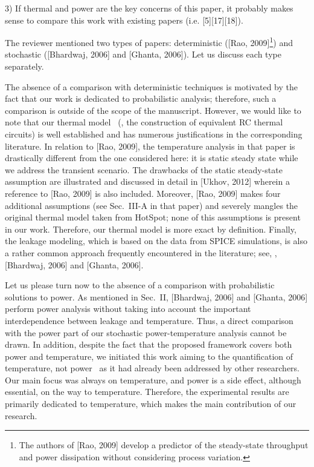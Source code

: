 \begin{reviewer}
3) If thermal and power are the key concerns of this paper, it probably makes sense to compare this work with existing papers (i.e. [5][17][18]).
\end{reviewer}
\begin{authors}
The reviewer mentioned two types of papers: deterministic ([Rao, 2009]\footnote{The authors of [Rao, 2009] develop a predictor of the steady-state throughput and power dissipation without considering process variation.}) and stochastic ([Bhardwaj, 2006] and [Ghanta, 2006]).
Let us discuss each type separately.

The absence of a comparison with deterministic techniques is motivated by the fact that our work is dedicated to probabilistic analysis; therefore, such a comparison is outside of the scope of the manuscript.
However, we would like to note that our thermal model \perse\ (\ie, the construction of equivalent RC thermal circuits) is well established and has numerous justifications in the corresponding literature.
In relation to [Rao, 2009], the temperature analysis in that paper is drastically different from the one considered here: it is static steady state while we address the transient scenario.
The drawbacks of the static steady-state assumption are illustrated and discussed in detail in [Ukhov, 2012] wherein a reference to [Rao, 2009] is also included.
Moreover, [Rao, 2009] makes four additional assumptions (see Sec.~III-A in that paper) and severely mangles the original thermal model taken from HotSpot; none of this assumptions is present in our work.
Therefore, our thermal model is more exact by definition.
Finally, the leakage modeling, which is based on the data from SPICE simulations, is also a rather common approach frequently encountered in the literature; see, \eg, [Bhardwaj, 2006] and [Ghanta, 2006].

Let us please turn now to the absence of a comparison with probabilistic solutions to power.
As mentioned in Sec.~II, [Bhardwaj, 2006] and [Ghanta, 2006] perform power analysis without taking into account the important interdependence between leakage and temperature.
Thus, a direct comparison with the power part of our stochastic power-temperature analysis cannot be drawn.
In addition, despite the fact that the proposed framework covers both power and temperature, we initiated this work aiming to the quantification of temperature, not power \perse\ as it had already been addressed by other researchers.
Our main focus was always on temperature, and power is a side effect, although essential, on the way to temperature.
Therefore, the experimental results are primarily dedicated to temperature, which makes the main contribution of our research.


\end{authors}
